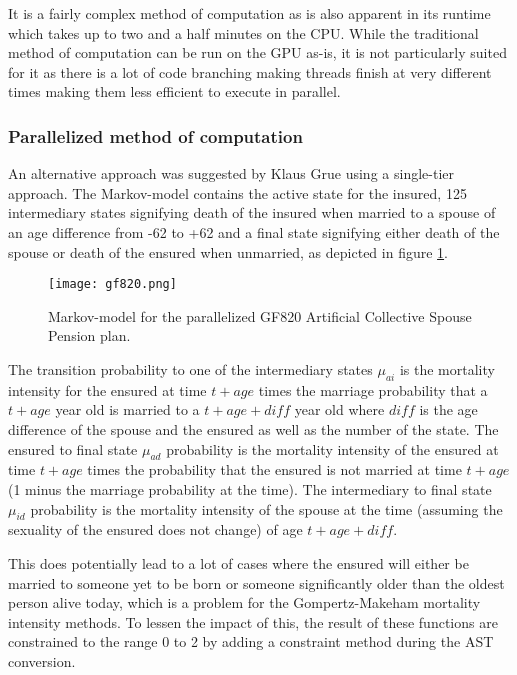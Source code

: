It is a fairly complex method of computation as is also apparent in its runtime which takes up to two and a half minutes on the CPU.
While the traditional method of computation can be run on the GPU as-is, it is not particularly suited for it as there is a lot of code branching making threads finish at very different times making them less efficient to execute in parallel.

\subsubsection{Parallelized method of computation}\label{subsubsec:gf820parallelized}
An alternative approach was suggested by Klaus Grue using a single-tier approach.
The Markov-model contains the active state for the insured, 125 intermediary states signifying death of the insured when married to a spouse of an age difference from -62 to +62 and a final state signifying either death of the spouse or death of the ensured when unmarried, as depicted in figure \ref{fig:gf820}.

\begin{figure}[h!]\centering
\texttt{[image: gf820.png]}
\caption{Markov-model for the parallelized GF820 Artificial Collective Spouse Pension plan.\label{fig:gf820}}
\end{figure}

The transition probability to one of the intermediary states $\mu_{ai}$ is the mortality intensity for the ensured at time $t + age$ times the marriage probability that a $t + age$ year old is married to a $t + age + diff$ year old where $diff$ is the age difference of the spouse and the ensured as well as the number of the state.
The ensured to final state $\mu_{ad}$ probability is the mortality intensity of the ensured at time $t + age$ times the probability that the ensured is not married at time $t + age$ (1 minus the marriage probability at the time).
The intermediary to final state $\mu_{id}$ probability is the mortality intensity of the spouse at the time (assuming the sexuality of the ensured does not change) of age $t + age + diff$.

This does potentially lead to a lot of cases where the ensured will either be married to someone yet to be born or someone significantly older than the oldest person alive today, which is a problem for the Gompertz-Makeham mortality intensity methods.
To lessen the impact of this, the result of these functions are constrained to the range 0 to 2 by adding a constraint method during the AST conversion.

